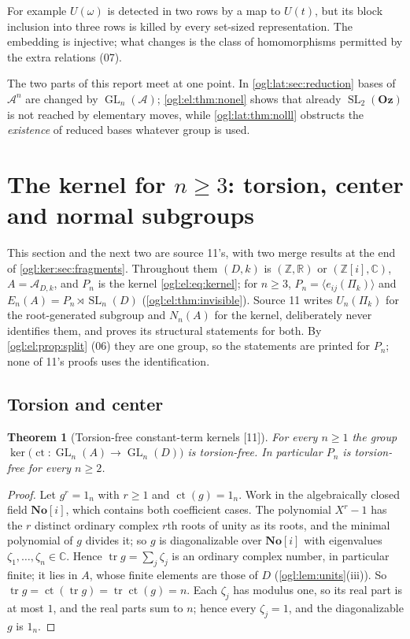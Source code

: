 \documentclass[11pt,oneside]{article}
\numberwithin{equation}{section}
\newtheorem{theorem}{Theorem}[section]
\theoremstyle{definition}
\theoremstyle{remark}
\newcommand{\No}{\mathbf{No}}
\newcommand{\Oz}{\mathbf{Oz}}
\newcommand{\SC}{\No[i]}
\newcommand{\Z}{\mathbb Z}
\newcommand{\R}{\mathbb R}
\newcommand{\C}{\mathbb C}
\newcommand{\A}{\mathcal A}
\newcommand{\ct}{\operatorname{ct}}
\newcommand{\GL}{\operatorname{GL}}
\newcommand{\SL}{\operatorname{SL}}
\newcommand{\tr}{\operatorname{tr}}
\newcommand{\src}[1]{\textup{\textsf{\small[#1]}}}
\begin{document}
For example $U(\omega)$ is detected in two rows by a map to $U(t)$, but its
block inclusion into three rows is killed by every set-sized representation. The
embedding is injective; what changes is the class of homomorphisms permitted by
the extra relations (07).

The two parts of this report meet at one point. In \cref{ogl:lat:sec:reduction}
bases of $\A^n$ are changed by $\GL_n(\A)$; \cref{ogl:el:thm:nonel} shows that
already $\SL_2(\Oz)$ is not reached by elementary moves, while
\cref{ogl:lat:thm:nolll} obstructs the \emph{existence} of reduced bases whatever
group is used.

\section{The kernel for \texorpdfstring{$n\ge3$}{n >= 3}: torsion, center and normal subgroups}\label{ogl:ker:sec:structure}

This section and the next two are source 11's, with two merge results at the
end of \cref{ogl:ker:sec:fragments}. Throughout them $(D,k)$ is $(\Z,\R)$ or
$(\Z[i],\C)$, $A=\A_{D,k}$, and $P_n$ is the kernel
\eqref{ogl:el:eq:kernel}; for $n\ge3$, $P_n=\langle e_{ij}(\Pi_k)\rangle$ and
$E_n(A)=P_n\rtimes\SL_n(D)$ (\cref{ogl:el:thm:invisible}). Source 11 writes
$U_n(\Pi_k)$ for the root-generated subgroup and $N_n(A)$ for the kernel,
deliberately never identifies them, and proves its structural statements for
both. By \cref{ogl:el:prop:split} (06) they are one group, so the statements are
printed for $P_n$; none of 11's proofs uses the identification.

\subsection{Torsion and center}

\begin{theorem}[Torsion-free constant-term kernels \src{11}]\label{ogl:ker:thm:torsionfree}
For every $n\ge1$ the group $\ker\bigl(\ct:\GL_n(A)\to\GL_n(D)\bigr)$ is
torsion-free. In particular $P_n$ is torsion-free for every $n\ge2$.
\end{theorem}
\begin{proof}
Let $g^r=1_n$ with $r\ge1$ and $\ct(g)=1_n$. Work in the algebraically closed
field $\SC$, which contains both coefficient cases. The polynomial $X^r-1$ has
the $r$ distinct ordinary complex $r$th roots of unity as its roots, and the
minimal polynomial of $g$ divides it; so $g$ is diagonalizable over $\SC$ with
eigenvalues $\zeta_1,\dots,\zeta_n\in\C$. Hence $\tr g=\sum_j\zeta_j$ is an
ordinary complex number, in particular finite; it lies in $A$, whose finite
elements are those of $D$ (\cref{ogl:lem:units}(iii)). So
$\tr g=\ct(\tr g)=\tr\ct(g)=n$. Each $\zeta_j$ has modulus one, so its real part
is at most $1$, and the real parts sum to $n$; hence every $\zeta_j=1$, and the
diagonalizable $g$ is $1_n$.
\end{proof}
\end{document}
